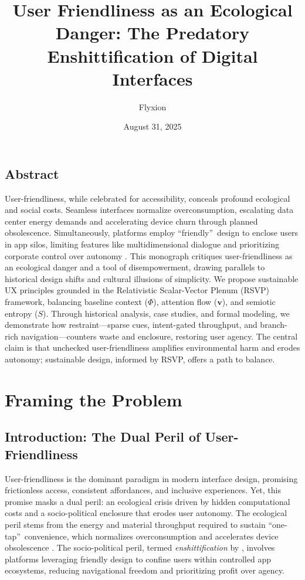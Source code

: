\documentclass[openany]{book}
\title{User Friendliness as an Ecological Danger: The Predatory Enshittification of Digital Interfaces}
\author{Flyxion}
\date{August 31, 2025}
\newcommand{\PhiS}{\Phi} %
\newcommand{\vvec}{\mathbf{v}} %
\newcommand{\Sent}{S} %
\begin{document}
\maketitle
{}

\chapter*{Abstract}
User-friendliness, while celebrated for accessibility, conceals profound ecological and social costs. Seamless interfaces normalize overconsumption, escalating data center energy demands and accelerating device churn through planned obsolescence. Simultaneously, platforms employ \textquotedblleft friendly\textquotedblright\ design to enclose users in app silos, limiting features like multidimensional dialogue and prioritizing corporate control over autonomy \citep{doctorow2022}. This monograph critiques user-friendliness as an ecological danger and a tool of disempowerment, drawing parallels to historical design shifts and cultural illusions of simplicity. We propose sustainable UX principles grounded in the Relativistic Scalar-Vector Plenum (RSVP) framework, balancing baseline context (\(\PhiS\)), attention flow (\(\vvec\)), and semiotic entropy (\(\Sent\)). Through historical analysis, case studies, and formal modeling, we demonstrate how restraint---sparse cues, intent-gated throughput, and branch-rich navigation---counters waste and enclosure, restoring user agency. The central claim is that unchecked user-friendliness amplifies environmental harm and erodes autonomy; sustainable design, informed by RSVP, offers a path to balance.

\clearpage
{}
\tableofcontents
\clearpage
{}

\part{Framing the Problem}

\chapter{Introduction: The Dual Peril of User-Friendliness}
\label{ch:intro}

User-friendliness is the dominant paradigm in modern interface design, promising frictionless access, consistent affordances, and inclusive experiences. Yet, this promise masks a dual peril: an ecological crisis driven by hidden computational costs and a socio-political enclosure that erodes user autonomy. The ecological peril stems from the energy and material throughput required to sustain \textquotedblleft one-tap\textquotedblright\ convenience, which normalizes overconsumption and accelerates device obsolescence \citep{extentia2024}. The socio-political peril, termed \emph{enshittification} by \citet{doctorow2022}, involves platforms leveraging friendly design to confine users within controlled app ecosystems, reducing navigational freedom and prioritizing profit over agency.
\end{document}
